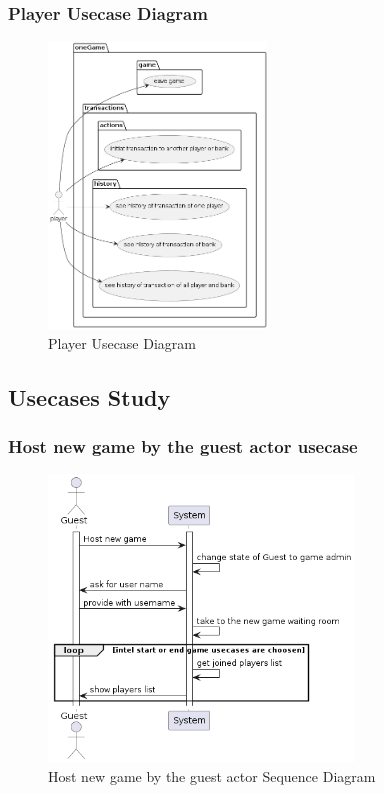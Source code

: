 \documentclass{article}
\begin{document}
\subsubsection{Player Usecase Diagram}
 \begin{figure}[H]
	 \centering
	 \includegraphics[height=3in]{../thesis_tex/assets/diagrams/player_ucd.png}
	 \caption{Player Usecase Diagram}
\end{figure}

\subsection{Usecases Study}
\subsubsection{Host new game by the guest actor usecase}
 \begin{figure}[H]
	 \centering
	 \includegraphics[height=3in]{../thesis_tex/assets/diagrams/guest_host_game_SD.png}
	 \caption{Host new game by the guest actor Sequence Diagram}
\end{figure}
\end{document}
